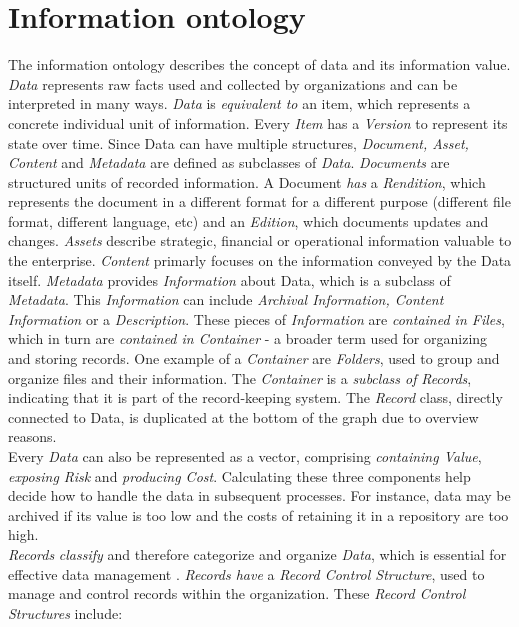 \documentclass[
  a4paper,  %
  twoside,  %
  bibliography=totoc,
  headsepline,
  cleardoublepage=empty,
  parskip=half,
  draft=false
]{scrbook}
\begin{document}
\section{Information ontology}
The information ontology describes the concept of data and its information value. \textit{Data} represents raw facts used and collected by organizations and can be interpreted in many ways. \textit{Data} is \textit{equivalent to} an item, which represents a concrete individual unit of information. Every \textit{Item} has a \textit{Version} to represent its state over time. Since Data can have multiple structures, \textit{Document, Asset, Content} and \textit{Metadata} are defined as subclasses of \textit{Data}. \textit{Documents} are structured units of recorded information. A Document \textit{has} a \textit{Rendition}, which represents the document in a different format for a different purpose (different file format, different language, etc) and an \textit{Edition}, which documents updates and changes. \textit{Assets} describe strategic, financial or operational information valuable to the enterprise. \textit{Content} primarly focuses on the information conveyed by the Data itself. \textit{Metadata} provides \textit{Information} about Data, which is a subclass of \textit{Metadata}. This \textit{Information} can include \textit{Archival Information, Content Information} or a \textit{Description}. These pieces of \textit{Information} are \textit{contained in Files}, which in turn are \textit{contained in Container} - a broader term used for organizing and storing records. One example of a \textit{Container} are \textit{Folders}, used to group and organize files and their information. The \textit{Container} is a \textit{subclass of} \textit{Records}, indicating that it is part of the record-keeping system. The \textit{Record} class, directly connected to Data, is duplicated at the bottom of the graph due to overview reasons. \\
Every \textit{Data} can also be represented as a vector, comprising \textit{containing Value}, \textit{exposing Risk} and \textit{producing Cost}. Calculating these three components help decide how to handle the data in subsequent processes. For instance, data may be archived if its value is too low and the costs of retaining it in a repository are too high.\\

\textit{Records} \textit{classify} and therefore categorize and organize \textit{Data}, which is essential for effective data management \cite{Franks2013Records}. \textit{Records have} a \textit{Record Control Structure}, used to manage and control records within the organization. These \textit{Record Control Structures} include: 
\end{document}
